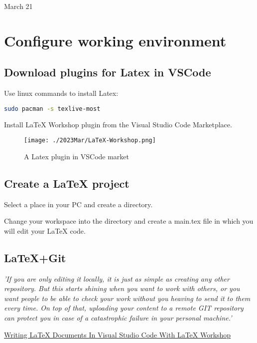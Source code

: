 \univlogo

{\Huge March 21}\vspace{5mm}

\section*{Configure working environment}

\subsection*{Download plugins for Latex in VSCode}

Use linux commands to install Latex:

\begin{lstlisting}[language=bash]
    sudo pacman -s texlive-most
\end{lstlisting}

Install LaTeX Workshop plugin from the Visual Studio Code Marketplace.

\begin{figure}[h]
\centering
\texttt{[image: ./2023Mar/LaTeX-Workshop.png]}
\caption{A Latex plugin in VSCode market}
\label{latexworkshop}
\end{figure}

\subsection*{Create a LaTeX project}

Select a place in your PC and create a directory.

Change your workspace into the directory and create a main.tex file in which you will edit your LaTeX code.

\subsection*{LaTeX+Git}

\emph{'If you are only editing it locally, it is just as simple as creating any other repository. But this starts shining when you want to work with others, or you want people to be able to check your work without you heaving to send it to them every time. On top of that, uploading your content to a remote GIT repository can protect you in case of a catastrophic failure in your personal machine.'}

\href{https://medium.com/@rcpassos/writing-latex-documents-in-visual-studio-code-with-latex-workshop-d9af6a6b2815}{Writing LaTeX Documents In Visual Studio Code With LaTeX Workshop} 


